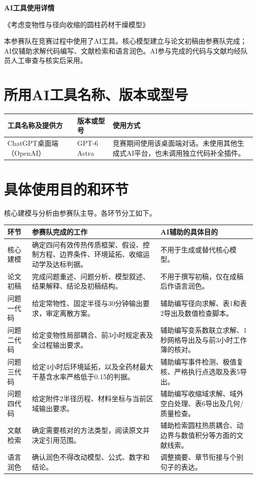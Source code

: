 \documentclass[UTF8,a4paper,zihao=5,fontset=windows]{ctexart}
\newcommand{\tabnote}[1]{\par\vspace{0.3em}{\small #1\par}}
\begin{document}
\begin{center}{\LARGE\bfseries AI工具使用详情}\par\medskip
{\large《考虑变物性与径向收缩的圆柱药材干燥模型》}
\end{center}

本参赛队在竞赛过程中使用了AI工具。核心模型建立与论文初稿由参赛队完成；AI仅辅助求解代码编写、文献检索和语言润色。AI参与完成的代码与文献均经队员人工审查与核实后采用。

\section{所用AI工具名称、版本或型号}
\noindent
\begin{tabular}{@{}L{.26\linewidth}L{.18\linewidth}L{.49\linewidth}@{}}
\toprule
工具名称及提供方 & 版本或型号 & 使用方式 \\\midrule
ChatGPT桌面端（OpenAI）&
GPT-6 Astra&
竞赛期间使用该桌面端对话。\newline 未使用其他生成式AI平台，也未调用独立代码补全插件。\\
\bottomrule
\end{tabular}

\tabnote{Python、NumPy、SciPy、Matplotlib、openpyxl及XeLaTeX属于本地执行与排版工具链，单独运行这些程序不属于生成式AI。AI辅助编写的是调用上述工具链的求解、导出与核验脚本；实际计算在队员本机完成。}

\section{具体使用目的和环节}
核心建模与分析由参赛队主导。各环节分工如下。

\noindent
\begin{tabular}{@{}L{.16\linewidth}L{.42\linewidth}L{.35\linewidth}@{}}
\toprule
环节 & 参赛队完成的工作 & AI辅助的具体目的 \\\midrule
核心建模 & 确定四问有效传热传质框架、假设、控制方程、边界条件、环境延拓、收缩运动学及达标判据。 & 不用于生成或替代核心模型。\\
论文初稿 & 完成问题重述、问题分析、模型叙述、结果解释、结论及初稿结构。 & 不用于撰写初稿，仅在成稿后作语言润色。\\
问题一代码 & 给定常物性、固定半径与30分钟输出要求，审定离散方案。 & 辅助编写径向求解、表1和表2导出及数值检查脚本。\\
问题二代码 & 给定变物性局部耦合、前3小时规定表及全过程输出要求。 & 辅助编写变系数联立求解、1秒网格导出及与前3小时工作簿的核对。\\
问题三代码 & 给定4小时后环境延拓，以及全药材最大干基含水率严格低于0.15的判据。 & 辅助编写事件检测、极值复核、严格执行点选取及表5导出。\\
问题四代码 & 给定附件2半径历程、材料坐标与当前区域输出要求。 & 辅助编写收缩域求解、域外空白处理、表6导出及几何/质量检查。\\
文献检索 & 确定需要核对的方法类型，阅读原文并决定引用范围。 & 辅助检索圆柱热质耦合、动边界与数值积分等方面的文献线索。\\
语言润色 & 确认润色不得改动模型、公式、数字和结论。 & 调整摘要、章节衔接与个别句子的表达。\\
\bottomrule
\end{tabular}
\end{document}

